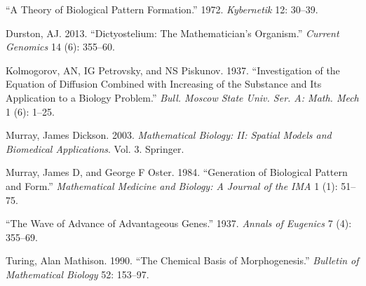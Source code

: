 \documentclass[
  letterpaper,
  DIV=11,
  numbers=noendperiod]{scrreprt}
\newlength{\cslhangindent}
\newlength{\cslentryspacingunit} %
\newenvironment{CSLReferences}[2] %
 {%
  \setlength{\parindent}{0pt}
  \ifodd #1
  \let\oldpar\par
  \def\par{\hangindent=\cslhangindent\oldpar}
  \fi
  \setlength{\parskip}{#2\cslentryspacingunit}
 }%
 {}
\theoremstyle{plain}
\theoremstyle{definition}
\theoremstyle{plain}
\theoremstyle{remark}
\begin{document}
\hypertarget{refs}{}
\begin{CSLReferences}{1}{0}
\leavevmode{}%
{``A Theory of Biological Pattern Formation.''} 1972. \emph{Kybernetik}
12: 30--39.

\leavevmode{}%
Durston, AJ. 2013. {``Dictyostelium: The Mathematician's Organism.''}
\emph{Current Genomics} 14 (6): 355--60.

\leavevmode{}%
Kolmogorov, AN, IG Petrovsky, and NS Piskunov. 1937. {``Investigation of
the Equation of Diffusion Combined with Increasing of the Substance and
Its Application to a Biology Problem.''} \emph{Bull. Moscow State Univ.
Ser. A: Math. Mech} 1 (6): 1--25.

\leavevmode{}%
Murray, James Dickson. 2003. \emph{Mathematical Biology: II: Spatial
Models and Biomedical Applications}. Vol. 3. Springer.

\leavevmode{}%
Murray, James D, and George F Oster. 1984. {``Generation of Biological
Pattern and Form.''} \emph{Mathematical Medicine and Biology: A Journal
of the IMA} 1 (1): 51--75.

\leavevmode{}%
{``The Wave of Advance of Advantageous Genes.''} 1937. \emph{Annals of
Eugenics} 7 (4): 355--69.

\leavevmode{}%
Turing, Alan Mathison. 1990. {``The Chemical Basis of Morphogenesis.''}
\emph{Bulletin of Mathematical Biology} 52: 153--97.

\end{CSLReferences}
\end{document}
